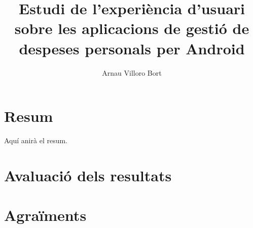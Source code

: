 \documentclass{book}
\title{Estudi de l'experiència d'usuari sobre les aplicacions de gestió de despeses personals per Android}
\author{Arnau Villoro Bort}
\begin{document}
\newcommand{\blueA}{\cellcolor{blue_table_1}}
\newcommand{\blueB}{\cellcolor{blue_table_2}}
\newcommand{\blueC}{\cellcolor{blue_table_3}}
\newcommand{\headA}[1]{\multicolumn{1}{|c|}{\blueA \textbf{#1}}}
\newcommand{\headB}[1]{\multicolumn{1}{|c|}{\blueB \textbf{#1}}}
\newcommand{\headC}[1]{\multicolumn{1}{|c|}{\blueC \textbf{#1}}}
\newcommand{\noBorde}[1]{\multicolumn{1}{#1}{}}


\frontmatter




\chapter*{Resum} \label{sec:Resum}
Aquí anirà el resum.

\tableofcontents





\mainmatter






\chapter{Avaluació dels resultats}







\chapter{Agraïments}


\end{document}
